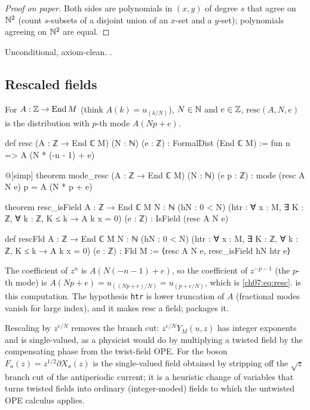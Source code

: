 \begin{proof}[Proof on paper]
Both sides are polynomials in $(x,y)$ of degree $s$ that agree on ${\mathbb{N}}^2$ (count $s$-subsets of a
disjoint union of an $x$-set and a $y$-set); polynomials agreeing on ${\mathbb{N}}^2$ are equal.
\end{proof}

\begin{status}
Unconditional, axiom-clean. .
\end{status}

\subsection{Rescaled fields}

\begin{definition}\label{ch07:def:resc}
For $A:{\mathbb{Z}}\to\operatorname{End} M$ (think $A(k) = u_{(k/N)}$), $N\in{\mathbb{N}}$ and $e\in{\mathbb{Z}}$, $\mathrm{resc}(A,N,e)$
is the distribution with $p$-th mode $A(Np+e)$.
\end{definition}

\begin{leancode}
def resc (A : ℤ → End ℂ M) (N : ℕ) (e : ℤ) : FormalDist (End ℂ M) :=
  fun n => A (N * (-n - 1) + e)

@[simp] theorem mode_resc (A : ℤ → End ℂ M) (N : ℕ) (e p : ℤ) :
    mode (resc A N e) p = A (N * p + e)

theorem resc_isField {A : ℤ → End ℂ M} {N : ℕ} (hN : 0 < N)
    (htr : ∀ x : M, ∃ K : ℤ, ∀ k : ℤ, K ≤ k → A k x = 0) (e : ℤ) : IsField (resc A N e)

def rescFld {A : ℤ → End ℂ M} {N : ℕ} (hN : 0 < N)
    (htr : ∀ x : M, ∃ K : ℤ, ∀ k : ℤ, K ≤ k → A k x = 0) (e : ℤ) : Fld M :=
  ⟨resc A N e, resc_isField hN htr e⟩
\end{leancode}

\begin{dictionary}
The coefficient of $z^n$ is $A(N(-n-1)+e)$, so the coefficient of $z^{-p-1}$ (the $p$-th mode) is
$A(Np+e) = u_{((Np+e)/N)} = u_{(p+e/N)}$, which is \eqref{ch07:eq:resc}.  is
this computation. The hypothesis \verb|htr| is lower truncation of $A$ (fractional modes vanish
for large index), and it makes $\mathrm{resc}$ a field;  packages it.
\end{dictionary}

\begin{physics}
Rescaling by $z^{e/N}$ removes the branch cut: $z^{e/N}Y_M(u,z)$ has integer exponents and is single-valued, as a physicist would do by multiplying a twisted field by the compensating phase from the twist-field OPE. For the boson $F_a(z)=z^{1/2}\partial X_a(z)$ is the single-valued field obtained by stripping off the $\sqrt z$ branch cut of the antiperiodic current; it is a heuristic change of variables that turns twisted fields into ordinary (integer-moded) fields to which the untwisted OPE calculus applies.
\end{physics}

